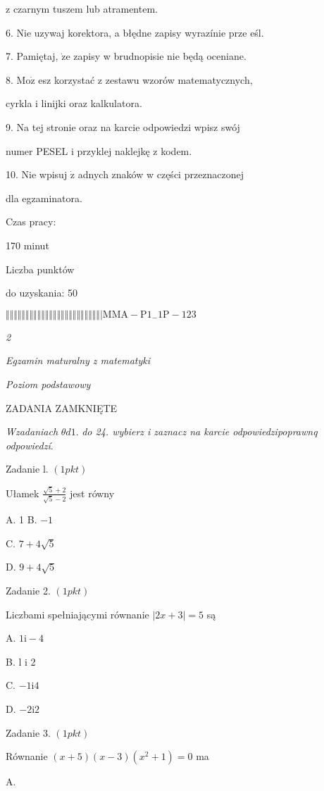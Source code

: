 \documentclass[a4paper,12pt]{article}
\begin{document}
z czarnym tuszem lub atramentem.

6. Nie uzywaj korektora, a błędne zapisy wyrazínie prze eśl.

7. Pamiętaj, $\dot{\mathrm{z}}\mathrm{e}$ zapisy w brudnopisie nie będą oceniane.

8. $\mathrm{M}\mathrm{o}\dot{\mathrm{z}}$ esz korzystać z zestawu wzorów matematycznych,

cyrkla i linijki oraz kalkulatora.

9. Na tej stronie oraz na karcie odpowiedzi wpisz swój

numer PESEL i przyklej naklejkę z kodem.

10. Nie wpisuj $\dot{\mathrm{z}}$ adnych znaków w części przeznaczonej

dla egzaminatora.

Czas pracy:

170 minut

Liczba punktów

do uzyskania: 50

$\Vert\Vert\Vert\Vert\Vert\Vert\Vert\Vert\Vert\Vert\Vert\Vert\Vert\Vert\Vert\Vert\Vert\Vert\Vert\Vert\Vert\Vert\Vert\Vert|  \mathrm{M}\mathrm{M}\mathrm{A}-\mathrm{P}1_{-}1\mathrm{P}-123$




{\it 2}

{\it Egzamin maturalny z matematyki}

{\it Poziom podstawowy}

ZADANIA ZAMKNIĘTE

{\it Wzadaniach} $\theta d1.$ {\it do 24. wybierz i zaznacz na karcie odpowiedzipoprawnq odpowiedzí}.

Zadanie l. $(1pkt)$

Ułamek $\displaystyle \frac{\sqrt{5}+2}{\sqrt{5}-2}$ jest równy

A. 1 B. $-1$

C. $7+4\sqrt{5}$

D. $9+4\sqrt{5}$

Zadanie 2. $(1pkt)$

Liczbami spełniającymi równanie $|2x+3|=5$ są

A. $1\mathrm{i}-4$

B. l i 2

C. $-1\mathrm{i}4$

D. $-2\mathrm{i}2$

Zadanie 3. $(1pkt)$

Równanie $(x+5)(x-3)(x^{2}+1)=0$ ma

A.
\end{document}
